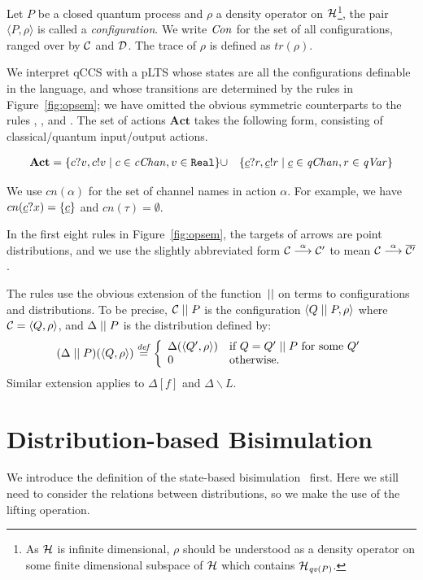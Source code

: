 \documentclass[runningheads]{llncs}
\def\>{\ensuremath{\rangle}}
\def\<{\ensuremath{\langle}}
\def\h{\ensuremath{\mathcal{H}}}
\newcommand{\define}{\stackrel{\it def}=}
\newcommand{\pdist}[1]{\overline{#1}  } %
\newcommand{\Act}{\ensuremath{\mathsf{Act}}\xspace}
\newcommand{\pair}[1]{\langle{#1}\rangle}
\newcommand{\Con}{{\it Con}}
\newcommand{\qv}{{\it qv}}
\newcommand{\qc}{\underline{c}}
\newcommand{\qVar}{{\it qVar}}
\newcommand{\cChan}{{\it cChan}}
\newcommand{\qChan}{{\it qChan}}
\newcommand{\CH}{{\cal H}}
\newcommand{\CC}{{\cal C}}
\newcommand{\CD}{{\cal D}}
\begin{document}
Let $P$ be a closed quantum process and $\rho$ a density operator on $\CH$\footnote{As $\CH$ is infinite dimensional, $\rho$ should be understood as a density operator on some finite dimensional subspace of $\CH$ which contains $\h_{\qv(P)}$.}, the pair $\pair{P,\rho}$ is called a \emph{configuration}. We write $\Con$ for the set of all configurations, ranged over by $\CC$ and $\CD$. The trace of $\rho$ is defined as $tr(\rho)$.

We interpret qCCS with a pLTS whose states are all the configurations definable in the language, and whose transitions are determined by the rules in Figure~\ref{fig:opsem}; we have omitted the obvious symmetric counterparts to the rules , ,  and . The set of actions $\textbf{Act}$ takes the following form, consisting of classical/quantum input/output actions.

\begin{eqnarray*}
\textbf{Act} = 
	\sset{c?v, c!v \mid c\in \cChan, v\in\texttt{Real}}&\cup&
	\sset{\qc?r,\qc!r \mid \qc\in \qChan,r\in \qVar}
\end{eqnarray*}

We use $cn(\alpha)$ for the set of channel names in action $\alpha$. For example, we have $cn(\qc?x)=\sset{\qc}$ and $cn(\tau)=\emptyset$.

In the first eight rules in Figure~\ref{fig:opsem}, the targets of arrows are point distributions, and we use the slightly abbreviated form $\CC\ar{\alpha}\CC'$ to mean $\CC\ar{\alpha}\pdist{\CC'}$.

The rules use the obvious extension of the function~$\mathrel{||}$ on terms to configurations and distributions. To be precise,
$\CC\Cpar P$ is the configuration $\<Q\Cpar P,\rho \>$ where $\CC=\<Q,\rho\>$, and
$\Delta\mathrel{||} P$ is the distribution defined by:
\[(\Delta\Cpar P)(\pair{Q,\rho}) \define \left\{\begin{array}{ll}
\Delta(\pair{Q',\rho}) & \mbox{if $Q=Q'\Cpar P$ for some } Q'\\
0 & \mbox{otherwise.}
\end{array}\right.\]
Similar extension applies to $\Delta[f]$ and $\Delta\backslash L$.

\section{Distribution-based Bisimulation}
\label{sec:distribution-based bisimulation}
We introduce the definition of the state-based bisimulation~\cite{DF12,FDY14} first. Here we still need to consider the relations between distributions, so we make the use of the lifting operation.
\end{document}
